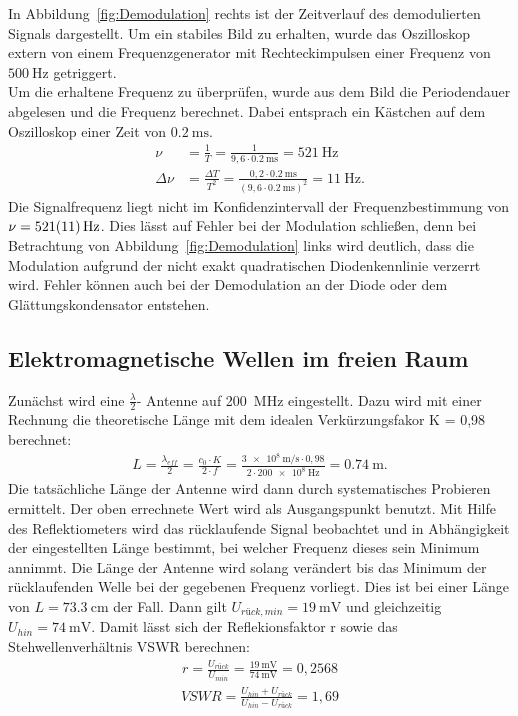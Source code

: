 \documentclass[a4paper,twoside,final]{article}
\begin{document}
In Abbildung~\ref{fig:Demodulation} rechts ist der Zeitverlauf des demodulierten Signals dargestellt. Um ein stabiles Bild zu erhalten, wurde das Oszilloskop extern von einem Frequenzgenerator mit Rechteckimpulsen einer Frequenz von $\SI{500}{\hertz}$ getriggert.\\
Um die erhaltene Frequenz zu überprüfen, wurde aus dem Bild die Periodendauer abgelesen und die Frequenz berechnet. Dabei entsprach ein Kästchen auf dem Oszilloskop einer Zeit von $\SI{0,2}{\milli\second}$.
\begin{align}
  \nu &= \frac{1}{T} = \frac{1}{9,6\cdot \SI{0,2}{\milli\second}} = \SI{521}{\hertz}\\
  \Delta \nu &= \frac{\Delta T}{T^2} = \frac{0,2\cdot \SI{0,2}{\milli\second}}{(9,6\cdot \SI{0,2}{\milli\second})^2} = \SI{11}{\hertz}.
\end{align}
Die Signalfrequenz liegt nicht im Konfidenzintervall der Frequenzbestimmung von $\nu = \SI{521\pm 11}{\hertz}$. Dies lässt auf Fehler bei der Modulation schließen, denn bei Betrachtung von Abbildung~\ref{fig:Demodulation} links wird deutlich, dass die Modulation aufgrund der nicht exakt quadratischen Diodenkennlinie verzerrt wird. Fehler können auch bei der Demodulation an der Diode oder dem Glättungskondensator entstehen.

\subsection{Elektromagnetische Wellen im freien Raum}
Zunächst wird eine $\frac{\lambda}{2}$- Antenne auf \SI{200}{\mega\hertz} eingestellt. Dazu wird mit einer Rechnung die theoretische Länge mit dem idealen Verkürzungsfakor K = 0,98 berechnet:
\begin{align}
L = \frac{\lambda_{eff}}{2} = \frac{c_0 \cdot K}{2 \cdot f} = \frac{\SI{3e8}{\meter\per\second} \cdot 0,98}{2 \cdot \SI{200e8}{\hertz}}  = \SI{0,74}{\meter}.
\end{align}
Die tatsächliche Länge der Antenne wird dann durch systematisches Probieren ermittelt. Der oben errechnete Wert wird als Ausgangspunkt benutzt. Mit Hilfe des Reflektiometers wird das rücklaufende Signal beobachtet und in Abhängigkeit der eingestellten Länge bestimmt, bei welcher Frequenz dieses sein Minimum annimmt. Die Länge der Antenne wird solang verändert bis das Minimum der rücklaufenden Welle bei der gegebenen Frequenz vorliegt. Dies ist bei einer Länge von $L = \SI{73,3}{\centi\meter}$ der Fall. Dann gilt $U_{rück, min} = \SI{19}{\milli\volt}$ und gleichzeitig $U_{hin} = \SI{74}{\milli\volt}$. Damit lässt sich der Reflekionsfaktor r sowie das Stehwellenverhältnis VSWR berechnen:
\begin{align}
r = \frac{U_{rück}}{U_{min}} = \frac{\SI{19}{\milli\volt}}{\SI{74}{\milli\volt}} = 0,2568
\end{align}
\begin{align}
VSWR = \frac{U_{hin}+U_{rück}}{U_{hin}-U_{rück}} = 1,69
\end{align}
\end{document}
